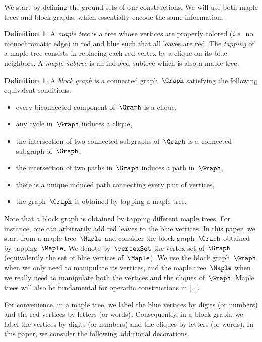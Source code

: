 \documentclass{amsart}
\theoremstyle{definition}
\newtheorem{definition}[theorem]{Definition}
\newcommand{\ie}{\textit{i.e.}~} %
\newcommand{\darkblue}{\color{darkblue}} %
\newcommand{\defn}[1]{\textsl{\darkblue #1}} %
\begin{document}
We start by defining the ground sets of our constructions.
We will use both maple trees and block graphs, which essentially encode the same information.

\begin{definition}
  A \defn{maple tree} is a tree whose vertices are properly colored (\ie no monochromatic edge) in red and blue such that all leaves are red.
  The \defn{tapping} of a maple tree consists in replacing each red vertex by a clique on its blue neighbors.
  A \defn{maple subtree} is an induced subtree which is also a maple tree.
\end{definition}

\begin{definition}
  \label{def:blockgraph}
  A \defn{block graph} is a connected graph~$\Graph$ satisfying the following equivalent conditions:
  \begin{itemize}
    \item every biconnected component of~$\Graph$ is a clique,
    \item any cycle in~$\Graph$ induces a clique,
    \item the intersection of two connected subgraphs of~$\Graph$ is a connected subgraph of~$\Graph$,
    \item the intersection of two paths in~$\Graph$ induces a path in~$\Graph$,
    \item there is a unique induced path connecting every pair of vertices,
    \item the graph~$\Graph$ is obtained by tapping a maple tree.
  \end{itemize}
\end{definition}

Note that a block graph is obtained by tapping different maple trees. For instance, one can arbitrarily add red leaves to the blue vertices.
In this paper, we start from a maple tree~$\Maple$ and consider the block graph~$\Graph$ obtained by tapping~$\Maple$.
We denote by~$\vertexSet$ the vertex set of~$\Graph$ (equivalently the set of blue vertices of~$\Maple$).
We use the block graph~$\Graph$ when we only need to manipulate its vertices, and the maple tree~$\Maple$ when we really need to manipulate both the vertices and the cliques of~$\Graph$.
Maple trees will also be fundamental for operadic constructions in \cref{..}.

For convenience, in a maple tree, we label the blue vertices by digits (or numbers) and the red vertices by letters (or words).
Consequently, in a block graph, we label the vertices by digits (or numbers) and the cliques by letters (or words).
In this paper, we consider the following additional decorations.
\end{document}
